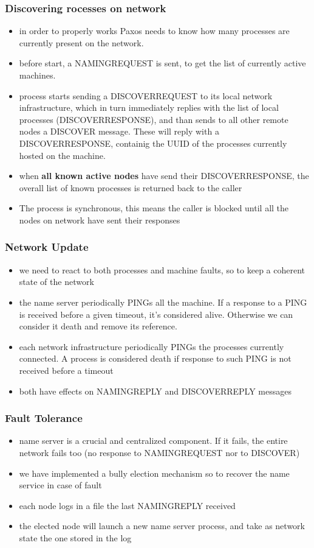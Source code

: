 \documentclass{beamer}
\begin{document}
\begin{frame}
  \frametitle{Discovering rocesses on network}
  \begin{itemize}
  \item in order to properly works Paxos needs to know how many processes are currently present on the network.
  \item before start, a NAMINGREQUEST is sent, to get the list of currently active machines.
  \item process starts sending a DISCOVERREQUEST to its local network infrastructure, which in turn immediately replies with the list of local processes (DISCOVERRESPONSE), and than sends to all other remote nodes a DISCOVER message. These will reply with a DISCOVERRESPONSE, containig the UUID of the processes currently hosted on the machine.
  \item when \textbf{all known active nodes} have send their DISCOVERRESPONSE, the overall list of known processes is returned back to the caller
  \item The process is synchronous, this means the caller is blocked until all the nodes on network have sent their responses
  \end{itemize}
\end{frame}

\begin{frame}
  \frametitle{Network Update}
  \begin{itemize}
  \item we need to react to both processes and machine faults, so to keep a coherent state of the network
  \item the name server periodically PINGs all the machine. If a response to a PING is received before a given timeout, it's considered alive. Otherwise we can consider it death and remove its reference.
  \item each network infrastructure periodically PINGs the processes currently connected. A process is considered death if response to such PING is not received before a timeout
  \item both have effects on NAMINGREPLY and DISCOVERREPLY messages
  \end{itemize}
\end{frame}

\begin{frame}
  \frametitle{Fault Tolerance}
  \begin{itemize}
  \item name server is a crucial and centralized component. If it fails, the entire network fails too (no response to NAMINGREQUEST nor to DISCOVER)
  \item we have implemented a bully election mechanism so to recover the name service in case of fault
  \item each node logs in a file the last NAMINGREPLY received
  \item the elected node will launch a new name server process, and take as network state the one stored in the log
  \end{itemize}
\end{frame}
  
\end{document}
